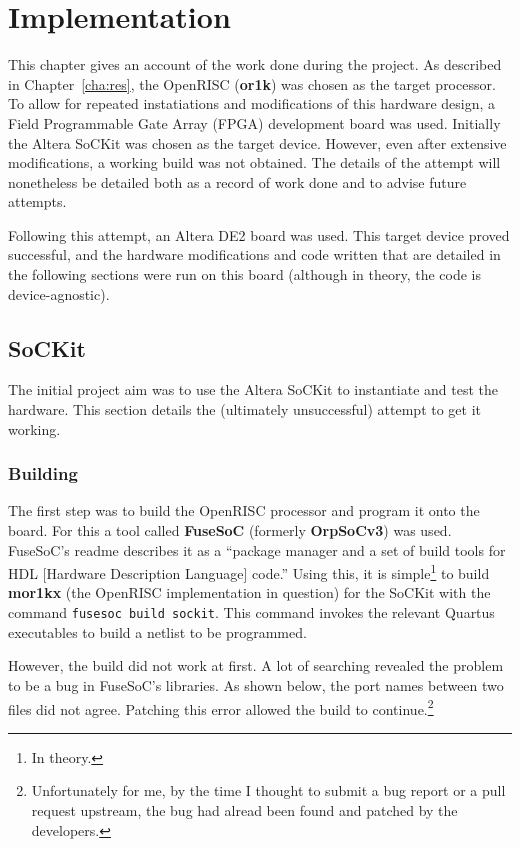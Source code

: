\chapter{Implementation}
\label{cha:imp}

This chapter gives an account of the work done during the project. As described in Chapter~\ref{cha:res}, the OpenRISC (\textbf{or1k}) was chosen as the target processor. To allow for repeated instatiations and modifications of this hardware design, a Field Programmable Gate Array (FPGA) development board was used. Initially the Altera SoCKit\cite{sockit} was chosen as the target device. However, even after extensive modifications, a working build was not obtained. The details of the attempt will nonetheless be detailed both as a record of work done and to advise future attempts.

Following this attempt, an Altera DE2 board\cite{de2} was used. This target device proved successful, and the hardware modifications and code written that are detailed in the following sections were run on this board (although in theory, the code is device-agnostic).

\section{SoCKit}
\label{sec:sockit}
The initial project aim was to use the Altera SoCKit to instantiate and test the hardware.  This section details the (ultimately unsuccessful) attempt to get it working.

\subsection{Building}
The first step was to build the OpenRISC processor and program it onto the board. For this a tool called \textbf{FuseSoC}\cite{fusesoc} (formerly \textbf{OrpSoCv3}) was used. FuseSoC's readme describes it as a ``package manager and a set of build tools for HDL [Hardware Description Language] code.'' Using this, it is simple\footnote{In theory.} to build \textbf{mor1kx} (the OpenRISC implementation in question) for the SoCKit with the command \verb|fusesoc build sockit|. This command invokes the relevant Quartus executables to build a netlist to be programmed.

However, the build did not work at first. A lot of searching revealed the problem to be a bug in FuseSoC's libraries. As shown below, the port names between two files did not agree. Patching this error allowed the build to continue.\footnote{Unfortunately for me, by the time I thought to submit a bug report or a pull request upstream, the bug had alread been found and patched by the developers.}


